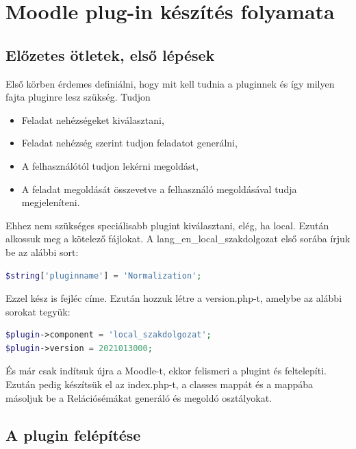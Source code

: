 \chapter{Moodle plug-in készítés folyamata \cite{MoodleTutorial}}

\section{Előzetes ötletek, első lépések}

Első körben érdemes definiálni, hogy mit kell tudnia a pluginnek és így milyen fajta pluginre lesz szükség. Tudjon
\begin{itemize}
    \item Feladat nehézségeket kiválasztani,
    \item Feladat nehézség szerint tudjon feladatot generálni,
    \item A felhasználótól tudjon lekérni megoldást,
    \item A feladat megoldását összevetve a felhasználó megoldásával tudja megjeleníteni.
\end{itemize}

Ehhez nem szükséges speciálisabb plugint kiválasztani, elég, ha local. Ezután alkossuk meg a kötelező fájlokat. A lang\_en\_local\_szakdolgozat első sorába írjuk be az alábbi sort:

\begin{lstlisting}[language=php]
$string['pluginname'] = 'Normalization';
\end{lstlisting}

Ezzel kész is fejléc címe. Ezután hozzuk létre a version.php-t, amelybe az alábbi sorokat tegyük:

\begin{lstlisting}[language=php]
$plugin->component = 'local_szakdolgozat';
$plugin->version = 2021013000;
\end{lstlisting}

És már csak indítsuk újra a Moodle-t, ekkor felismeri a plugint és feltelepíti. Ezután pedig készítsük el az index.php-t, a classes mappát és a mappába másoljuk be a Relációsémákat generáló és megoldó osztályokat.

\section{A plugin felépítése}

